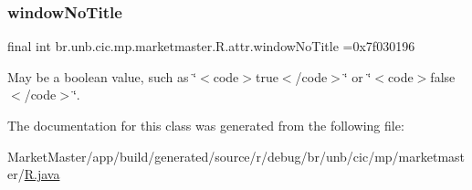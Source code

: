 \subsubsection{\texorpdfstring{window\+No\+Title}{windowNoTitle}}
{\footnotesize\ttfamily final int br.\+unb.\+cic.\+mp.\+marketmaster.\+R.\+attr.\+window\+No\+Title =0x7f030196\hspace{0.3cm}{\ttfamily [static]}}

May be a boolean value, such as \char`\"{}$<$code$>$true$<$/code$>$\char`\"{} or \char`\"{}$<$code$>$false$<$/code$>$\char`\"{}. 

The documentation for this class was generated from the following file\+:\begin{DoxyCompactItemize}
\item 
Market\+Master/app/build/generated/source/r/debug/br/unb/cic/mp/marketmaster/\mbox{\hyperlink{debug_2br_2unb_2cic_2mp_2marketmaster_2R_8java}{R.\+java}}\end{DoxyCompactItemize}
